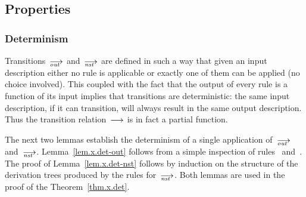 

\subsection{Properties}
\label{sec.sem.props}


\subsubsection{Determinism}

Transitions~$\out$ and~$\nst$ are defined in such a way that given an input
description either no rule is applicable or exactly one of them can be
applied (no choice involved).  This coupled with the fact that the output of
every rule is a function of its input implies that transitions are
deterministic: the same input description, if it can transition, will always
result in the same output description.  Thus the transition
relation~$\trans$ is in fact a partial function.

The next two lemmas establish the determinism of a single application
of~$\out$ and~$\nst$.  Lemma~\ref{lem.x.det-out} follows from a simple
inspection of rules~ and~.  The proof of
Lemma~\ref{lem.x.det-nst} follows by induction on the structure of the
derivation trees produced by the rules for~$\nst$.  Both lemmas are used in
the proof of the Theorem~\ref{thm.x.det}.

